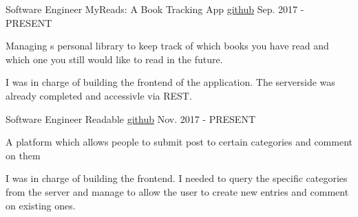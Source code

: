 

\begin{cventries}

  \cventry
    {Software Engineer} %
    {MyReads: A Book Tracking App} %
    {\href{https://github.com/marwinmd/reactnd-project-myreads-starter}{github}} %
    {Sep. 2017 - PRESENT} %
    {
      \begin{cvitems} %
        \item {Managing s personal library to keep track of which books you have read and which one you still would like to read in the future.}
        \item{I was in charge of building the frontend of the application. The serverside was already completed and accessivle via REST.}
      \end{cvitems}
    }

  \cventry
    {Software Engineer} %
    {Readable} %
    { \href{https://github.com/marwinmd/readable}{github} } %
    {Nov. 2017 - PRESENT} %
    {
      \begin{cvitems} %
        \item {A platform which allows people to submit post to certain categories and comment on them}
        \item{I was in charge of building the frontend. I needed to query the specific categories from the server and manage to allow the user to create new entries and comment on existing ones.}
      \end{cvitems}
    }

\end{cventries}
